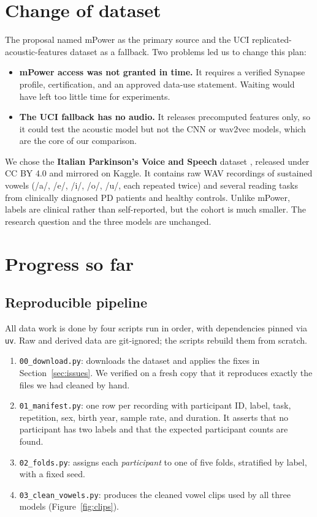 \documentclass{article}
\begin{document}
\section{Change of dataset}
The proposal named mPower \citep{bot2016} as the primary source and the UCI replicated-acoustic-features dataset \citep{uci489} as a fallback. Two problems led us to change this plan:
\begin{itemize}
  \item \textbf{mPower access was not granted in time.} It requires a verified Synapse profile, certification, and an approved data-use statement. Waiting would have left too little time for experiments.
  \item \textbf{The UCI fallback has no audio.} It releases precomputed features only, so it could test the acoustic model but not the CNN or wav2vec models, which are the core of our comparison.
\end{itemize}
We chose the \textbf{Italian Parkinson's Voice and Speech} dataset \citep{dimauro2019}, released under CC BY 4.0 and mirrored on Kaggle. It contains raw WAV recordings of sustained vowels (/a/, /e/, /i/, /o/, /u/, each repeated twice) and several reading tasks from clinically diagnosed PD patients and healthy controls. Unlike mPower, labels are clinical rather than self-reported, but the cohort is much smaller. The research question and the three models are unchanged.

\section{Progress so far}
\subsection{Reproducible pipeline}
All data work is done by four scripts run in order, with dependencies pinned via \texttt{uv}. Raw and derived data are git-ignored; the scripts rebuild them from scratch.
\begin{enumerate}
  \item \texttt{00\_download.py}: downloads the dataset and applies the fixes in Section~\ref{sec:issues}. We verified on a fresh copy that it reproduces exactly the files we had cleaned by hand.
  \item \texttt{01\_manifest.py}: one row per recording with participant ID, label, task, repetition, sex, birth year, sample rate, and duration. It asserts that no participant has two labels and that the expected participant counts are found.
  \item \texttt{02\_folds.py}: assigns each \emph{participant} to one of five folds, stratified by label, with a fixed seed.
  \item \texttt{03\_clean\_vowels.py}: produces the cleaned vowel clips used by all three models (Figure~\ref{fig:clips}).
\end{enumerate}
\end{document}
